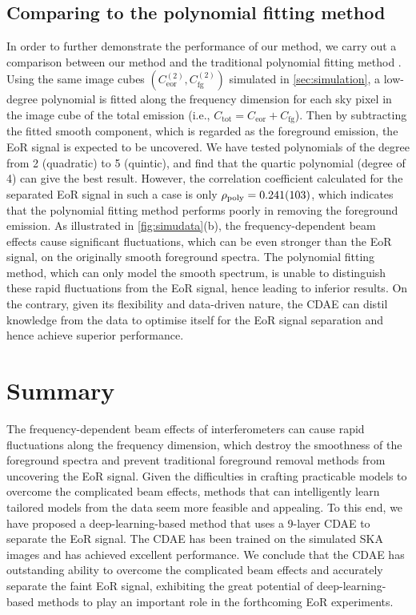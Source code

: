 \documentclass[fleqn,usenatbib]{mnras}
\newcommand{\R}[1]{\mathrm{#1}}
\newcommand{\editwip}[1]{{\leavevmode\color{magenta}#1}}
\begin{document}
\subsection{Comparing to the polynomial fitting method}
\label{sec:polyfit}

In order to further demonstrate the performance of our method, we carry
out a comparison between our method and the traditional polynomial
fitting method \citep[e.g.,][]{wang2006,liu2009ps}.
Using the same image cubes
\editwip{$\left( C_{\R{eor}}^{(2)}, C_{\R{fg}}^{(2)} \right)$}
simulated in \autoref{sec:simulation},
a low-degree polynomial is fitted along the frequency dimension for each
sky pixel in the image cube of the total emission (i.e.,
$C_{\R{tot}} = C_{\R{eor}} + C_{\R{fg}}$).
Then by subtracting the fitted smooth component, which is regarded as
the foreground emission, the EoR signal is expected to be uncovered.
We have tested polynomials of the degree from 2 (quadratic) to
5 (quintic), and find that the quartic polynomial (degree of 4)
can give the best result.
However, the correlation coefficient calculated for the separated EoR
signal in such a case is only $\rho_{\R{poly}} = \num{0.241 +- 0.103}$,
which indicates that the polynomial fitting method
performs poorly in removing the foreground emission.
As illustrated in \autoref{fig:simudata}(b), the frequency-dependent
beam effects cause significant fluctuations, which can be even stronger
than the EoR signal, on the originally smooth foreground spectra.
The polynomial fitting method, which can only model the smooth
spectrum, is unable to distinguish these rapid fluctuations from the
EoR signal, hence leading to inferior results.
On the contrary, given its flexibility and data-driven nature,
the CDAE can distil knowledge from the data to optimise itself for
the EoR signal separation and hence achieve superior performance.


\section{Summary}
\label{sec:summary}

The frequency-dependent beam effects of interferometers can cause
rapid fluctuations along the frequency dimension,
which destroy the smoothness of the foreground spectra and prevent
traditional foreground removal methods from uncovering the EoR signal.
Given the difficulties in crafting practicable models to overcome the
complicated beam effects, methods that can intelligently learn tailored
models from the data seem more feasible and appealing.
To this end, we have proposed a deep-learning-based method that uses
a 9-layer CDAE to separate the EoR signal.
The CDAE has been trained on the simulated SKA images and has achieved
excellent performance.
We conclude that the CDAE has outstanding ability to overcome the
complicated beam effects and accurately separate the faint EoR signal,
exhibiting the great potential of deep-learning-based methods
to play an important role in the forthcoming EoR experiments.
\end{document}

